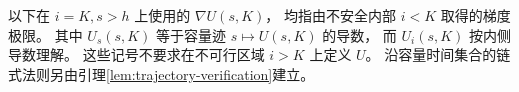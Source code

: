 以下在 $i=K,s>h$ 上使用的 $\nabla U(s,K)$，
均指由不安全内部 $i<K$ 取得的梯度极限。
其中 $U_s(s,K)$ 等于容量迹 $s\mapsto U(s,K)$ 的导数，
而 $U_i(s,K)$ 按内侧导数理解。
这些记号不要求在不可行区域 $i>K$ 上定义 $U$。
沿容量时间集合的链式法则另由引理\ref{lem:trajectory-verification}建立。
